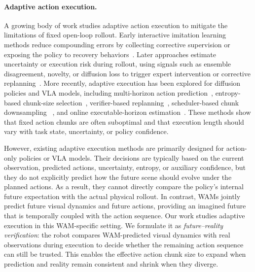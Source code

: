 \documentclass{article}
\begin{document}
\paragraph{Adaptive action execution.}
\label{sec:adaptive action execution}
A growing body of work studies adaptive action execution to mitigate the limitations of fixed open-loop rollout. Early interactive imitation learning methods reduce compounding errors by collecting corrective supervision or exposing the policy to recovery behaviors~\citep{ross2011reduction,
laskey2017dart}. Later approaches estimate uncertainty or execution risk during rollout, using signals such as ensemble disagreement, novelty, or diffusion loss to trigger expert intervention or corrective replanning~\citep{menda2019ensembledagger, hoque2021thriftydagger, lee2025diff}. More recently, adaptive execution has been explored for diffusion policies and VLA models, including multi-horizon action prediction~\citep{jing2025mixture}, entropy-based chunk-size selection~\citep{liang2026adaptive}, verifier-based replanning~\citep{wang2026open}, scheduler-based chunk downsampling
~\citep{wu2026speedup}, and online executable-horizon estimation~\citep{wang2026vla}. These methods show that fixed action chunks are often suboptimal and that execution length should vary with task state, uncertainty, or policy confidence.

However, existing adaptive execution methods are primarily designed for action-only policies or VLA models. Their decisions are typically based on the current observation, predicted actions, uncertainty, entropy, or auxiliary confidence, but they do not explicitly predict how the future scene should evolve under the planned actions. As a result, they cannot directly compare the policy's internal future expectation with the actual physical rollout. In contrast, WAMs jointly predict future visual dynamics and future actions, providing an imagined future that is temporally coupled with the action sequence. Our work studies adaptive execution in this WAM-specific setting. We formulate it as \emph{future--reality verification}: the robot compares WAM-predicted visual dynamics with real observations during execution to decide whether the remaining action sequence can still be trusted. This enables the effective action chunk size to expand when prediction and reality remain consistent and shrink when they diverge.
\end{document}
